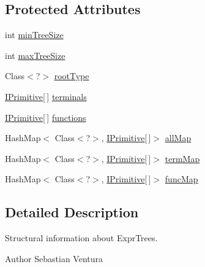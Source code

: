 \subsection*{Protected Attributes}
\begin{DoxyCompactItemize}
\item 
int \hyperlink{classnet_1_1sf_1_1jclec_1_1exprtree_1_1_expr_tree_schema_a1ac93c0fc7bd111a376ab405ec7b8fb3}{min\-Tree\-Size}
\item 
int \hyperlink{classnet_1_1sf_1_1jclec_1_1exprtree_1_1_expr_tree_schema_a5a222e091d9f7eaa07c7acee9b50efc1}{max\-Tree\-Size}
\item 
Class$<$?$>$ \hyperlink{classnet_1_1sf_1_1jclec_1_1exprtree_1_1_expr_tree_schema_a249024518906b1b72f537d5b61ea16ff}{root\-Type}
\item 
\hyperlink{interfacenet_1_1sf_1_1jclec_1_1exprtree_1_1_i_primitive}{I\-Primitive}\mbox{[}$\,$\mbox{]} \hyperlink{classnet_1_1sf_1_1jclec_1_1exprtree_1_1_expr_tree_schema_aa60f19ae52e55d9ed07ca1089c88d65a}{terminals}
\item 
\hyperlink{interfacenet_1_1sf_1_1jclec_1_1exprtree_1_1_i_primitive}{I\-Primitive}\mbox{[}$\,$\mbox{]} \hyperlink{classnet_1_1sf_1_1jclec_1_1exprtree_1_1_expr_tree_schema_aca234d53fec87216b84803146e1b23c6}{functions}
\item 
Hash\-Map$<$ Class$<$?$>$, \hyperlink{interfacenet_1_1sf_1_1jclec_1_1exprtree_1_1_i_primitive}{I\-Primitive}\mbox{[}$\,$\mbox{]}$>$ \hyperlink{classnet_1_1sf_1_1jclec_1_1exprtree_1_1_expr_tree_schema_a5b9a3597e40853603084bd67a4b5a09d}{all\-Map}
\item 
Hash\-Map$<$ Class$<$?$>$, \hyperlink{interfacenet_1_1sf_1_1jclec_1_1exprtree_1_1_i_primitive}{I\-Primitive}\mbox{[}$\,$\mbox{]}$>$ \hyperlink{classnet_1_1sf_1_1jclec_1_1exprtree_1_1_expr_tree_schema_acef767f8d25191e8d2fa6ef1c9bf5ae4}{term\-Map}
\item 
Hash\-Map$<$ Class$<$?$>$, \hyperlink{interfacenet_1_1sf_1_1jclec_1_1exprtree_1_1_i_primitive}{I\-Primitive}\mbox{[}$\,$\mbox{]}$>$ \hyperlink{classnet_1_1sf_1_1jclec_1_1exprtree_1_1_expr_tree_schema_aadf3e30ac3d79e7b5dfae0e0caf7d658}{func\-Map}
\end{DoxyCompactItemize}


\subsection{Detailed Description}
Structural information about Expr\-Trees.

\begin{DoxyAuthor}{Author}
Sebastian Ventura 
\end{DoxyAuthor}


